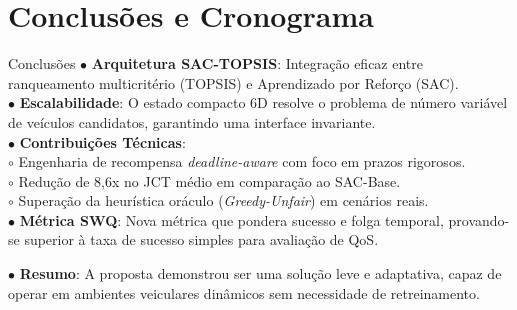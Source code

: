 \documentclass{beamer}
\begin{document}
\section{Conclusões e Cronograma}
\begin{frame}{Conclusões}
    \scriptsize
    $\bullet$ \textbf{Arquitetura SAC-TOPSIS}: Integração eficaz entre ranqueamento multicritério (TOPSIS) e Aprendizado por Reforço (SAC).\\
    $\bullet$ \textbf{Escalabilidade}: O estado compacto 6D resolve o problema de número variável de veículos candidatos, garantindo uma interface invariante.\\
    $\bullet$ \textbf{Contribuições Técnicas}:\\
    \hspace*{0.4cm} $\circ$ Engenharia de recompensa \textit{deadline-aware} com foco em prazos rigorosos.\\
    \hspace*{0.4cm} $\circ$ Redução de 8,6x no JCT médio em comparação ao SAC-Base.\\
    \hspace*{0.4cm} $\circ$ Superação da heurística oráculo (\textit{Greedy-Unfair}) em cenários reais.\\
    $\bullet$ \textbf{Métrica SWQ}: Nova métrica que pondera sucesso e folga temporal, provando-se superior à taxa de sucesso simples para avaliação de QoS.
    \begin{tcolorbox}[colback=blue!5, colframe=blue!40, arc=0pt, outer arc=0pt, leftrule=3pt, rightrule=0.3pt, toprule=0.1pt, bottomrule=0.3pt]
        \scriptsize $\bullet$ \textbf{Resumo}: A proposta demonstrou ser uma solução leve e adaptativa, capaz de operar em ambientes veiculares dinâmicos sem necessidade de retreinamento.
    \end{tcolorbox}
\end{frame}
\end{document}
